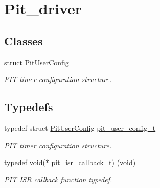 \hypertarget{group__pit__driver}{}\section{Pit\+\_\+driver}
\label{group__pit__driver}
\subsection*{Classes}
\begin{DoxyCompactItemize}
\item 
struct \hyperlink{structPitUserConfig}{Pit\+User\+Config}
\begin{DoxyCompactList}\small\item\em P\+IT timer configuration structure. \end{DoxyCompactList}\end{DoxyCompactItemize}
\subsection*{Typedefs}
\begin{DoxyCompactItemize}
\item 
typedef struct \hyperlink{structPitUserConfig}{Pit\+User\+Config} \hyperlink{group__pit__driver_ga05f144da781ddb765b1ec9ac8887c7eb}{pit\+\_\+user\+\_\+config\+\_\+t}
\begin{DoxyCompactList}\small\item\em P\+IT timer configuration structure. \end{DoxyCompactList}\item 
typedef void($\ast$ \hyperlink{group__pit__driver_gaa877fbdf0d2c05a13fde6c680d1d6b4d}{pit\+\_\+isr\+\_\+callback\+\_\+t}) (void)\hypertarget{group__pit__driver_gaa877fbdf0d2c05a13fde6c680d1d6b4d}{}\label{group__pit__driver_gaa877fbdf0d2c05a13fde6c680d1d6b4d}

\begin{DoxyCompactList}\small\item\em P\+IT I\+SR callback function typedef. \end{DoxyCompactList}\end{DoxyCompactItemize}
